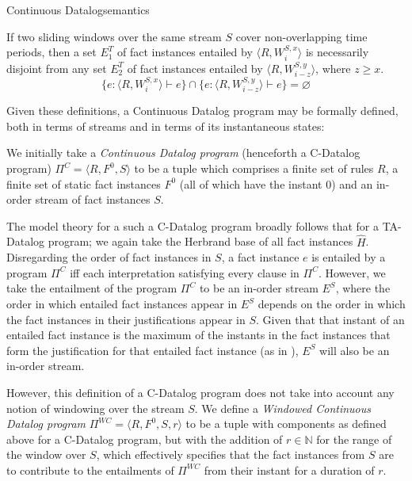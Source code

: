 \begin{nestedsection}{Continuous Datalog}{semantics}
\begin{axiom}\label{axiom:continuous datalog: entailment disjointness}
  If two sliding windows over the same stream $S$ cover non-overlapping time periods,
then a set $E^T_1$ of fact instances entailed by ${\langle R, W^{S,x}_i \rangle}$
is necessarily disjoint from any set $E^T_2$ of fact instances entailed by
$\langle R, W^{S,y}_{i-z} \rangle$, where ${z \geq x}$.
\[
\{ e : \langle R , W^{S,x}_i \rangle \vdash e \} \cap \{ e : \langle R , W^{S,y}_{i-z} \rangle \vdash e \} = \varnothing
\]
\end{axiom}

Given these definitions, a Continuous Datalog program may be formally
defined, both in terms of streams and in terms of its instantaneous
states:

\begin{definition}

We initially take a {\em Continuous Datalog program} (henceforth a
C-Datalog program) $\Pi^C = \langle R, F^0, S \rangle$ to be a tuple
which comprises a finite set of rules $R$, a finite set of static fact
instances $F^0$ (all of which have the instant $0$) and an in-order
stream of fact instances $S$.

The model theory for a such a C-Datalog program broadly follows that
for a TA-Datalog program; we again take the Herbrand base of all fact
instances $\hat{H}$. Disregarding the order of fact instances in $S$,
a fact instance $e$ is entailed by a program $\Pi^C$ iff each
interpretation satisfying every clause in $\Pi^C$. However, we take
the entailment of the program $\Pi^C$ to be an in-order stream $E^S$,
where the order in which entailed fact instances appear in $E^S$
depends on the order in which the fact instances in their
justifications appear in $S$. Given that that instant of an entailed
fact instance is the maximum of the instants in the fact instances
that form the justification for that entailed fact instance (as in
), $E^S$ will also
be an in-order stream.

However, this definition of a C-Datalog program does not take into
account any notion of windowing over the stream $S$. We define a {\em
  Windowed Continuous Datalog program} $\Pi^{WC} = \langle R, F^0, S,
r \rangle$ to be a tuple with components as defined above for a
C-Datalog program, but with the addition of $r \in \mathbb{N}$ for the
range of the window over $S$, which effectively specifies that the
fact instances from $S$ are to contribute to the entailments of $\Pi^{WC}$
from their instant for a duration of $r$.


\end{definition}
\end{nestedsection}
